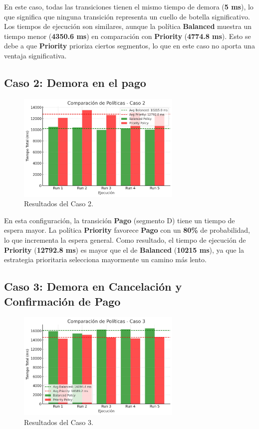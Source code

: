 \documentclass[12pt]{article}
\begin{document}
En este caso, todas las transiciones tienen el mismo tiempo de demora (\textbf{5 ms}), lo que significa que ninguna transición representa un cuello de botella significativo. Los tiempos de ejecución son similares, aunque la política \textbf{Balanced} muestra un tiempo menor (\textbf{4350.6 ms}) en comparación con \textbf{Priority} (\textbf{4774.8 ms}). Esto se debe a que \textbf{Priority} prioriza ciertos segmentos, lo que en este caso no aporta una ventaja significativa.

\subsection{Caso 2: Demora en el pago}

\begin{figure}[H]
    \centering
    \includegraphics[width=0.7\textwidth]{CASO_2.jpeg}
    \caption{Resultados del Caso 2.}
\end{figure}

En esta configuración, la transición \textbf{Pago} (segmento D) tiene un tiempo de espera mayor. La política \textbf{Priority} favorece \textbf{Pago} con un \textbf{80\%} de probabilidad, lo que incrementa la espera general. Como resultado, el tiempo de ejecución de \textbf{Priority} (\textbf{12792.8 ms}) es mayor que el de \textbf{Balanced} (\textbf{10215 ms}), ya que la estrategia prioritaria selecciona mayormente un camino más lento.

\subsection{Caso 3: Demora en Cancelación y Confirmación de Pago}

\begin{figure}[H]
    \centering
    \includegraphics[width=0.7\textwidth]{CASO_3.jpeg}
    \caption{Resultados del Caso 3.}
\end{figure}
\end{document}
